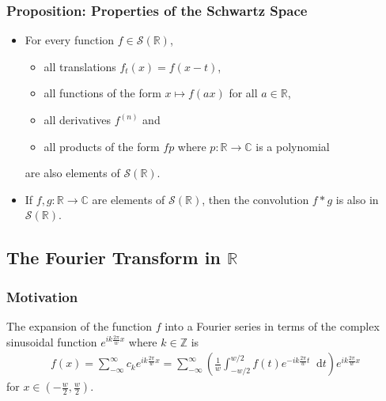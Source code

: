 \documentclass[11pt, a4paper]{article}
\newcommand{\diff}{\mathop{}\!\mathrm{d}} %
\newcommand{\R}{\mathbb{R}} %
\newcommand{\C}{\mathbb{C}} %
\begin{document}
\subsubsection{Proposition: Properties of the Schwartz Space}
\begin{itemize}
	\item For every function $ f \in  \mathcal{S}(\R) $,
	\begin{itemize}
		\item all translations $ f_t(x) = f(x - t) $,
		\item all functions of the form $ x \mapsto f(ax)$ for all $ a \in \R $,
		\item all derivatives $ f^{(n)} $ and
		\item all products of the form $ fp $ where $ p:\R \to \C $ is a polynomial
	\end{itemize}
	are also elements of $ \mathcal{S}(\R) $.
	
	\item If $ f, g : \R \to \C $ are elements of $ \mathcal{S}(\R)  $, then the convolution $ f * g $ is also in $ \mathcal{S}(\R)  $.
\end{itemize}


\subsection{The Fourier Transform in $ \R $}


\subsubsection{Motivation}

The expansion of the function $ f $ into a Fourier series in terms of the complex sinusoidal function $ e^{ik\frac{2\pi}{w}x} $ where $ k \in \mathbb{Z} $ is
\begin{align*}
	f(x) = \sum_{-\infty}^{\infty} c_k e^{ik\frac{2\pi}{w}x} =  \sum_{-\infty}^{\infty}\left(\frac{1}{w}\int_{-w/2}^{w/2} f(t)  e^{-ik\frac{2\pi}{w}t} \diff t \right) e^{ik\frac{2\pi}{w}x}
\end{align*}
for $ x \in \left(- \frac{w}{2}, \frac{w}{2} \right) $.
\end{document}
